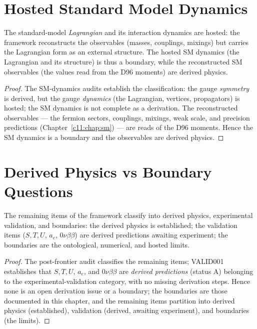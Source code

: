 \section{Hosted Standard Model Dynamics}
\label{c13:sec:hosted-sm}

\begin{theorem}
\label{c13:thm:sm-hosted}
The standard-model \emph{Lagrangian} and its interaction dynamics are hosted: the framework
reconstructs the observables (masses, couplings, mixings) but carries the Lagrangian form as
an external structure. The hosted SM dynamics (the Lagrangian and its structure) is thus a
boundary, while the reconstructed SM observables (the values read from the D96 moments) are
derived physics.
\end{theorem}

\begin{proof}
The SM-dynamics audits \cite{c13:QG242,c13:QG245} establish the classification: the gauge
\emph{symmetry} is derived, but the gauge \emph{dynamics} (the Lagrangian, vertices,
propagators) is hosted; the SM dynamics is not complete as a derivation. The reconstructed
observables --- the fermion sectors, couplings, mixings, weak scale, and precision
predictions (Chapter~\ref{c11:chap:sm}) --- are reads of the D96 moments. Hence the SM
dynamics is a boundary and the observables are derived physics.
\end{proof}

\section{Derived Physics vs Boundary Questions}
\label{c13:sec:derived-vs-boundary}

\begin{theorem}
\label{c13:thm:classification}
The remaining items of the framework classify into derived physics, experimental
validation, and boundaries: the derived physics is established; the validation items
($S,T,U$, $a_e$, $0\nu\beta\beta$) are derived predictions awaiting experiment; the
boundaries are the ontological, numerical, and hosted limits.
\end{theorem}

\begin{proof}
The post-frontier audit \cite{c13:QG299} classifies the remaining items; VALID001
\cite{c13:VALID001} establishes that $S,T,U$, $a_e$, and $0\nu\beta\beta$ are \emph{derived
predictions} (status A) belonging to the experimental-validation category, with no missing
derivation steps. Hence none is an open derivation issue or a boundary; the boundaries are
those documented in this chapter, and the remaining items partition into derived physics
(established), validation (derived, awaiting experiment), and boundaries (the limits).
\end{proof}

